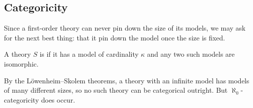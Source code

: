 \subsection{Categoricity}

Since a first-order theory can never pin down the size of its models, we may ask for the next best thing: that it pin down the model once the size is fixed.

\begin{definition}[Categoricity]
  A theory $S$ is  if it has a model of cardinality $\kappa$ and any two such models are isomorphic.
\end{definition}

By the L\"owenheim--Skolem theorems, a theory with an infinite model has models of many different sizes, so no such theory can be categorical outright. But $\aleph_0$-categoricity does occur.

